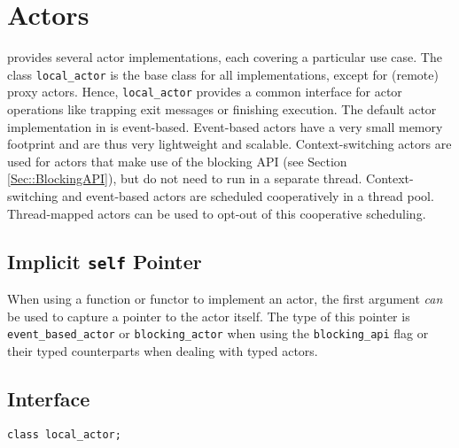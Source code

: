 \section{Actors}

\libcppa provides several actor implementations, each covering a particular use case.
The class \lstinline^local_actor^ is the base class for all implementations, except for (remote) proxy actors.
Hence, \lstinline^local_actor^ provides a common interface for actor operations like trapping exit messages or finishing execution.
The default actor implementation in \libcppa is event-based.
Event-based actors have a very small memory footprint and are thus very lightweight and scalable.
Context-switching actors are used for actors that make use of the blocking API (see Section \ref{Sec::BlockingAPI}), but do not need to run in a separate thread.
Context-switching and event-based actors are scheduled cooperatively in a thread pool.
Thread-mapped actors can be used to opt-out of this cooperative scheduling.

\subsection{Implicit \texttt{self} Pointer}

When using a function or functor to implement an actor, the first argument \emph{can} be used to capture a pointer to the actor itself.
The type of this pointer is \lstinline^event_based_actor^ or \lstinline^blocking_actor^ when using the \lstinline^blocking_api^ flag or their typed counterparts when dealing with typed actors.

\clearpage
\subsection{Interface}

\begin{lstlisting}
class local_actor;
\end{lstlisting}

